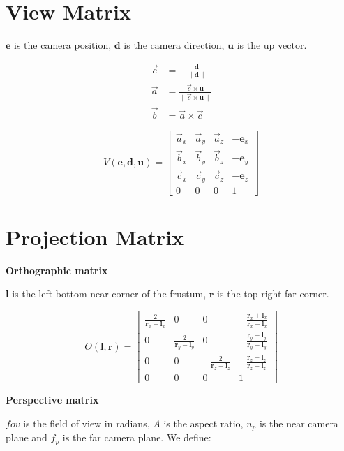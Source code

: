 \section{View Matrix}

$\mathbf{e}$ is the camera position, $\mathbf{d}$ is the camera direction, $\mathbf{u}$ is the up vector.

\begin{equation*}
\begin{split}
\vec{c} &= -\frac{\mathbf{d}}{\|\mathbf{d}\|} \\
\vec{a} &= \frac{\vec{c} \times \mathbf{u}}{\|\vec{c} \times \mathbf{u}\|} \\
\vec{b} &= \vec{a} \times \vec{c} 
\end{split}
\end{equation*}

$$
V(\mathbf{e},\mathbf{d},\mathbf{u}) = \left[\begin{array}{cccc}
\vec{a}_x & \vec{a}_y & \vec{a}_z & -\mathbf{e}_x      \\
\vec{b}_x & \vec{b}_y & \vec{b}_z & -\mathbf{e}_y        \\
\vec{c}_x & \vec{c}_y & \vec{c}_z & -\mathbf{e}_z       \\
0 & 0 & 0 & 1
\end{array}\right]$$

\section{Projection Matrix}

\textbf{Orthographic matrix}

$\mathbf{l}$ is the left bottom near corner of the frustum, $\mathbf{r}$ is the top right far corner.

$$
O(\mathbf{l},\mathbf{r}) = \left[\begin{array}{cccc}
\frac{2}{\mathbf{r}_x-\mathbf{l}_x} & 0 & 0 & -\frac{\mathbf{r}_x+\mathbf{l}_x}{\mathbf{r}_x-\mathbf{l}_x}       \\
0 & \frac{2}{\mathbf{r}_y-\mathbf{l}_y} & 0 & -\frac{\mathbf{r}_y+\mathbf{l}_y}{\mathbf{r}_y-\mathbf{l}_y}      \\
0 & 0 &  - \frac{2}{\mathbf{r}_z-\mathbf{l}_z} & -\frac{\mathbf{r}_z+\mathbf{l}_z}{\mathbf{r}_z-\mathbf{l}_z}      \\
0 & 0 & 0 & 1
\end{array}\right]
$$

\textbf{Perspective matrix}

$fov$ is the field of view in radians, $A$ is the aspect ratio, $n_p$ is the near camera plane and $f_p$ is the far camera plane. We define:

